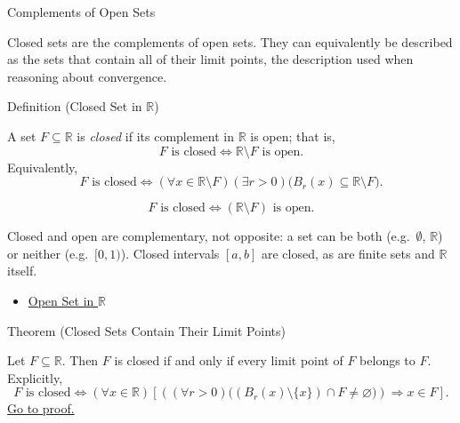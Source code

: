 \label{sec:closed-sets}

\begin{topicbox}{Complements of Open Sets}
\begin{exposition}
Closed sets are the complements of open sets. They can equivalently be described as the sets that contain all of their limit points, the description used when reasoning about convergence.
\end{exposition}
\end{topicbox}
\begin{definitionbox}{Definition (Closed Set in $\mathbb{R}$)}
\begin{definition}
\label{def:closed-set}
A set $F\subseteq\mathbb{R}$ is \emph{closed} if its complement in
$\mathbb{R}$ is open; that is,
\[
  F\text{ is closed}
  \Longleftrightarrow
  \mathbb{R}\setminus F\text{ is open}.
\]
Equivalently,
\[
  F\text{ is closed}
  \Longleftrightarrow
  (\forall x\in\mathbb{R}\setminus F)(\exists r>0)
  \bigl(B_r(x)\subseteq\mathbb{R}\setminus F\bigr).
\]
\end{definition}
\end{definitionbox}
\begin{remark*}
\[
F \text{ is closed} \Longleftrightarrow (\mathbb{R}\setminus F) \text{ is open}.
\]
\end{remark*}
\begin{remark*}[Interpretation]
Closed and open are complementary, not opposite: a set can be both (e.g.\ $\emptyset$, $\mathbb{R}$) or neither (e.g.\ $[0,1)$). Closed intervals $[a,b]$ are closed, as are finite sets and $\mathbb{R}$ itself.
\end{remark*}
\begin{dependencies}
\begin{itemize}
  \item \hyperref[def:open-set]{Open Set in $\mathbb{R}$}
\end{itemize}
\end{dependencies}
\begin{theorembox}{Theorem (Closed Sets Contain Their Limit Points)}
\begin{theorem}
\label{thm:closed-iff-contains-limit-points}
Let $F\subseteq\mathbb{R}$.  Then $F$ is closed if and only if every limit
point of $F$ belongs to $F$.  Explicitly,
\[
  F\text{ is closed}
  \Longleftrightarrow
  (\forall x\in\mathbb{R})
  \left[
  \left((\forall r>0)\bigl((B_r(x)\setminus\{x\})\cap F\neq\varnothing\bigr)\right)
  \Longrightarrow
  x\in F
  \right].
\]
\hyperref[prf:closed-iff-contains-limit-points]{Go to proof.}
\end{theorem}
\end{theorembox}
